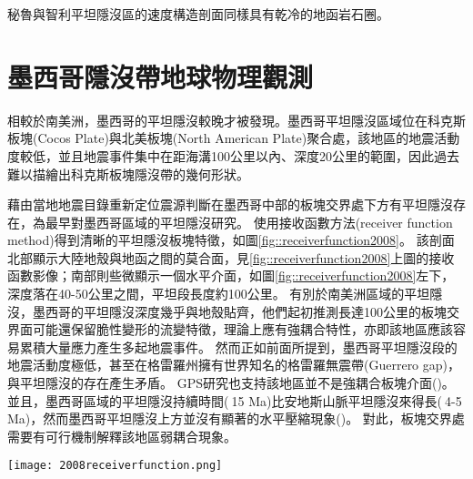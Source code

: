 
秘魯與智利平坦隱沒區的速度構造剖面同樣具有乾冷的地函岩石圈。

\section{墨西哥隱沒帶地球物理觀測}\label{墨西哥隱沒帶地球物理觀測}
相較於南美洲，墨西哥的平坦隱沒較晚才被發現。墨西哥平坦隱沒區域位在科克斯板塊(Cocos Plate)與北美板塊(North American Plate)聚合處，該地區的地震活動度較低，並且地震事件集中在距海溝100公里以內、深度20公里的範圍，因此過去難以描繪出科克斯板塊隱沒帶的幾何形狀。

\citealp{pardo1995}藉由當地地震目錄重新定位震源判斷在墨西哥中部的板塊交界處下方有平坦隱沒存在，為最早對墨西哥區域的平坦隱沒研究。
\citealp{PerezCampos2008}使用接收函數方法(receiver function method)得到清晰的平坦隱沒板塊特徵，如圖\ref{fig::receiverfunction2008}。
該剖面北部顯示大陸地殼與地函之間的莫合面，見\ref{fig::receiverfunction2008}上圖的接收函數影像；南部則些微顯示一個水平介面，如圖\ref{fig::receiverfunction2008}左下，深度落在40-50公里之間，平坦段長度約100公里。
有別於南美洲區域的平坦隱沒，墨西哥的平坦隱沒深度幾乎與地殼貼齊，他們起初推測長達100公里的板塊交界面可能還保留脆性變形的流變特徵，理論上應有強耦合特性，亦即該地區應該容易累積大量應力產生多起地震事件。
然而正如前面所提到，墨西哥平坦隱沒段的地震活動度極低，甚至在格雷羅州擁有世界知名的格雷羅無震帶(Guerrero gap)，與平坦隱沒的存在產生矛盾。
GPS研究也支持該地區並不是強耦合板塊介面(\citealp{nieto2006latest})。
並且，墨西哥區域的平坦隱沒持續時間($~$15 Ma)比安地斯山脈平坦隱沒來得長($~$4-5 Ma)，然而墨西哥平坦隱沒上方並沒有顯著的水平壓縮現象(\citealp{moran2007cenozoic})。
對此，板塊交界處需要有可行機制解釋該地區弱耦合現象。

\begin{figure*}[ht!]
    \centering
    \texttt{[image: 2008receiverfunction.png]}
    \caption[墨西哥平坦隱沒區域接收函數結果]{墨西哥平坦隱沒區域接收函數結果，摘自\citealp{PerezCampos2008}。上圖：黑色三角形表示測站沿剖面的位置，高程被放大10倍。粗棕色線表示跨墨西哥火山帶(TMVB, Trans-Mexican Volcanic Belt)的範圍。上圖接收函數影像中標出沿剖面50公里範圍內的震源(粉紅色點來自SSN地震目錄；綠色點來自\citealp{pardo1995}重新定位結果)位置。下方左圖：顯示沿平坦隱沒板塊的一次遠震事件的接收函數。下方中間圖:說明了相應的模型（LVM(low velocity mantle) = 低速地函和 OC(oceanic crust) = 海洋地殼）。下方右圖：根據左下圖接收函數模型中A、B和C位置上的P波速度模型。
    }
    \label{fig::receiverfunction2008}
\end{figure*}

